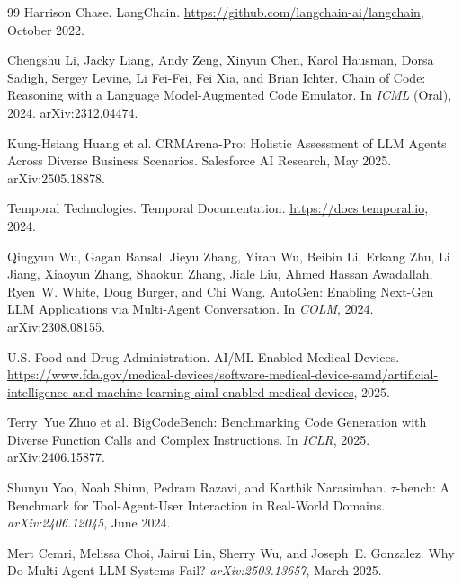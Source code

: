 \documentclass[11pt]{article}
\begin{document}
\begin{thebibliography}{99}
Harrison Chase.
\newblock LangChain.
\newblock \url{https://github.com/langchain-ai/langchain}, October 2022.

Chengshu Li, Jacky Liang, Andy Zeng, Xinyun Chen, Karol Hausman, Dorsa Sadigh, Sergey Levine, Li Fei-Fei, Fei Xia, and Brian Ichter.
\newblock Chain of Code: Reasoning with a Language Model-Augmented Code Emulator.
\newblock In \emph{ICML} (Oral), 2024.
\newblock arXiv:2312.04474.

Kung-Hsiang Huang et al.
\newblock CRMArena-Pro: Holistic Assessment of LLM Agents Across Diverse Business Scenarios.
\newblock Salesforce AI Research, May 2025.
\newblock arXiv:2505.18878.

Temporal Technologies.
\newblock Temporal Documentation.
\newblock \url{https://docs.temporal.io}, 2024.

Qingyun Wu, Gagan Bansal, Jieyu Zhang, Yiran Wu, Beibin Li, Erkang Zhu, Li Jiang, Xiaoyun Zhang, Shaokun Zhang, Jiale Liu, Ahmed Hassan Awadallah, Ryen~W. White, Doug Burger, and Chi Wang.
\newblock AutoGen: Enabling Next-Gen LLM Applications via Multi-Agent Conversation.
\newblock In \emph{COLM}, 2024.
\newblock arXiv:2308.08155.

U.S. Food and Drug Administration.
\newblock AI/ML-Enabled Medical Devices.
\newblock \url{https://www.fda.gov/medical-devices/software-medical-device-samd/artificial-intelligence-and-machine-learning-aiml-enabled-medical-devices}, 2025.


Terry~Yue Zhuo et al.
\newblock BigCodeBench: Benchmarking Code Generation with Diverse Function Calls and Complex Instructions.
\newblock In \emph{ICLR}, 2025.
\newblock arXiv:2406.15877.

Shunyu Yao, Noah Shinn, Pedram Razavi, and Karthik Narasimhan.
\newblock $\tau$-bench: A Benchmark for Tool-Agent-User Interaction in Real-World Domains.
\newblock \emph{arXiv:2406.12045}, June 2024.

Mert Cemri, Melissa Choi, Jairui Lin, Sherry Wu, and Joseph~E. Gonzalez.
\newblock Why Do Multi-Agent LLM Systems Fail?
\newblock \emph{arXiv:2503.13657}, March 2025.


\end{thebibliography}
\end{document}
